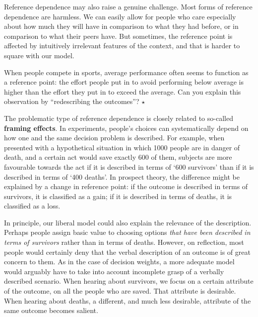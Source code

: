 Reference dependence may also raise a genuine challenge. Most forms of
reference dependence are harmless. We can easily allow for people who
care especially about how much they will have in comparison to what
they had before, or in comparison to what their peers have. But
sometimes, the reference point is affected by intuitively
irrelevant features of the context, and that is harder to square with
our model.

\begin{exercise}
  When people compete in sports, average performance often seems to
  function as a reference point: the effort people put in to avoid
  performing below average is higher than the effort they put in to
  exceed the average.%
  Can you explain this observation by ``redescribing the outcomes''?
  $\star$
\end{exercise}



The problematic type of reference dependence is closely related to
so-called \textbf{framing effects}. In experiments, people's choices
can systematically depend on how one and the same decision problem is
described. For example, when presented with a hypothetical situation
in which 1000 people are in danger of death, and a certain act would
save exactly 600 of them, subjects are more favourable towards the act
if it is described in terms of `600 survivors' than if it is described
in terms of `400 deaths'. In prospect theory, the difference might be
explained by a change in reference point: if the outcome is described
in terms of survivors, it is classified as a gain; if it is described
in terms of deaths, it is classified as a loss.

In principle, our liberal model could also explain the relevance of
the description. Perhaps people assign basic value to choosing options
\emph{that have been described in terms of survivors} rather than in
terms of deaths. However, on reflection, most people would certainly
deny that the verbal description of an outcome is of great concern to
them. As in the case of decision weights, a more adequate model would
arguably have to take into account incomplete grasp of a verbally
described scenario. When hearing about survivors, we focus on a
certain attribute of the outcome, on all the people who are
saved. That attribute is desirable. When hearing about deaths, a
different, and much less desirable, attribute of the same outcome
becomes salient.

